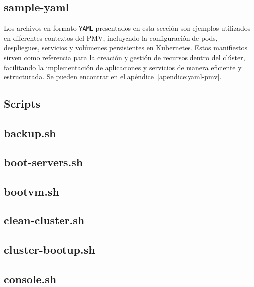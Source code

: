 \subsection{sample-yaml}
\noindent
Los archivos en formato \texttt{YAML} presentados en esta sección son ejemplos utilizados en diferentes contextos del PMV, incluyendo la configuración de pods, despliegues, servicios y volúmenes persistentes en Kubernetes. Estos manifiestos sirven como referencia para la creación y gestión de recursos dentro del clúster, facilitando la implementación de aplicaciones y servicios de manera eficiente y estructurada.
Se pueden encontrar en el apéndice~\ref{apendice:yaml-pmv}.


\subsection{Scripts}

\subsection{backup.sh}
\noindent


\subsection{boot-servers.sh}
\noindent


\subsection{bootvm.sh}
\noindent


\subsection{clean-cluster.sh}
\noindent


\subsection{cluster-bootup.sh}
\noindent


\subsection{console.sh}
\noindent


